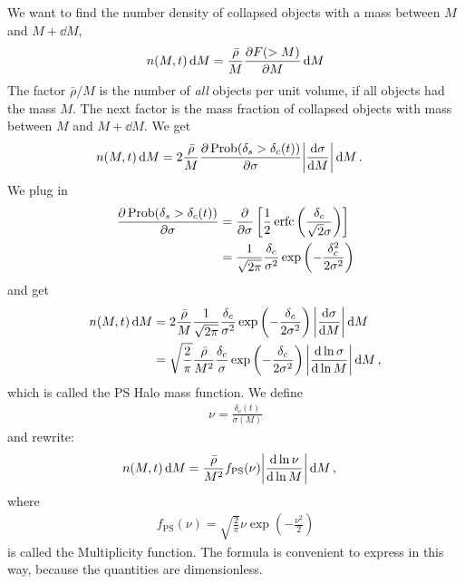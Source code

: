 We want to find the number density of collapsed objects with a mass between $M$ and $M + \dd{M}$,
\begin{align*}
	n(M, t) \dd{M}
	= \frac{\bar{\rho}}{M}
	\pdv{F(>M)}{M} \dd{M}
\end{align*}
The factor $\bar{\rho}/M$ is the number of \emph{all} objects per unit volume, if all objects had the mass $M$.
The next factor is the mass fraction of collapsed objects with mass between $M$ and $M+ \dd{M}$.
We get
\begin{align*}
	n(M, t) \dd{M}
	&= 2 \frac{\bar{\rho}}{M}
	\pdv{\Prob(\delta_s > \delta_c(t))}{\sigma}
	\abs*{ \dv{\sigma}{M} }
	\dd{M}.
\end{align*}
We plug in
\begin{align*}
	\pdv{\Prob(\delta_s > \delta_c(t))}{\sigma}
	&=
	\pdv{}{\sigma} \left[ 
		\frac{1}{2} \erfc \left( \frac{\delta_c}{\sqrt{2} \sigma} \right)
	 \right]\\
	&= \frac{1}{\sqrt{2\pi}}
	\frac{\delta_c}{\sigma^2}
	\exp\left( - \frac{\delta_c^2}{2 \sigma^2} \right)
\end{align*}
and get
\begin{align*}
	n(M, t) \dd{M}
	&= 2 \frac{\bar{\rho}}{M}
	\frac{1}{\sqrt{2\pi}}
	\frac{\delta_c}{\sigma^2}
	\exp\left( -\frac{\delta_c}{2\sigma^2} \right)
	\abs*{\dv{\sigma}{M}} \dd{M}\\
	&= \sqrt{\frac{2}{\pi}}
	\frac{\bar{\rho}}{M^2}
	\frac{\delta_c}{\sigma}
	\exp\left( -\frac{\delta_c}{2\sigma^2} \right)
	\abs*{\dv{\ln \sigma}{\ln M}}
	\dd{M},
\end{align*}
which is called the PS Halo mass function.
We define
\begin{align*}
	\nu = \frac{\delta_c(t)}{\sigma(M)}
\end{align*}
and rewrite:
\begin{align*}
	n(M, t) \dd{M}
	&= \frac{\bar{\rho}}{M^2} f_\text{PS}(\nu)
	\abs*{ \dv{\ln \nu}{\ln M} } \dd{M},
\end{align*}
where
\begin{align*}
	f_\text{PS}(\nu)
	= \sqrt{\frac{2}{\pi}} \nu \exp\left( - \frac{\nu^2}{2} \right)
\end{align*}
is called the Multiplicity function.
The formula is convenient to express in this way, because the quantities are dimensionless.

